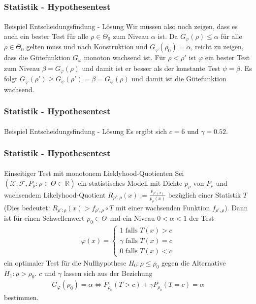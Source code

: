 \documentclass{beamer}
\begin{document}
\begin{frame}
    \frametitle{Statistik - Hypothesentest}
\framesubtitle{}

\begin{block}{Beispiel Entscheidungsfindung - Lösung}
Wir müssen also noch zeigen, dass es auch ein bester Test für alle $\rho \in \Theta_0$ zum Niveau $\alpha$ ist. 
Da  $G_{\varphi} (\rho) \leq \alpha$ für alle $\rho \in \Theta_0$  gelten muss und nach Konstruktion und $G_{\varphi} (\rho_0) = \alpha$, reicht zu zeigen, dass die Gütefunktion  $G_{\varphi}$ monoton wachsend ist. Für $\rho < \rho'$ ist $\varphi$ ein bester Test zum Niveau $\beta = G_{\varphi} (\rho)$ und damit ist er besser als der konstante Test  $\psi = \beta$. Es folgt  
$G_{\varphi} (\rho') \geq G_{\psi} (\rho') = \beta = G_{\varphi} (\rho) $ und damit ist die Gütefunktion  wachsend.
\end{block}

 \end{frame}



\begin{frame}
    \frametitle{Statistik - Hypothesentest}
\framesubtitle{}

\begin{block}{Beispiel Entscheidungsfindung - Lösung}
Es ergibt sich $c = 6$ und $\gamma = 0.52$.
\end{block}

 \end{frame}



\begin{frame}
    \frametitle{Statistik - Hypothesentest}
\framesubtitle{}

\begin{block}{Einseitiger Test mit monotonem Lieklyhood-Quotienten}
Sei   $(\mathcal{X}, \mathcal{F}, P_\rho :  \rho \in \Theta \subset \mathbb{R})$ ein statistisches Modell mit Dichte $p_{\rho}$ von $P_\rho$ und wachsendem  Likelyhood-Quotient  $R_{\rho' : \rho} (x):= \frac{p_{\rho' (x)}}{p_{\rho}(x)}$ bezüglich einer Statistik  $T$ (Dies bedeutet: $R_{\rho' : \rho} (x) > f_{\rho', \rho} \circ T$ mit einer wachsenden Funktion $f_{\rho', \rho}$). Dann ist für einen  Schwellenwert $\rho_0 \in \Theta$ und ein Niveau $0 <\alpha < 1$ der Test 
\begin{align*}
 \varphi(x) = \begin{cases} 1 \text{ falls } T(x) > c \\  \gamma  \text{ falls } T(x) = c \\ 0 \text{ falls } T(x) < c  \end{cases}
\end{align*}
ein optimaler Test für die Nullhypothese $H_0 : \rho \leq \rho_0$ gegen die Alternative  $H_1 : \rho > \rho_0$. 
$c$ und $\gamma$ lassen sich aus der Beziehung
\begin{align}
G_\varphi(\rho_0) = \alpha  \Leftrightarrow P_{\rho_0}(T  > c) + \gamma P_{\rho_0}(T = c) = \alpha
\end{align}
 bestimmen.
\end{block}



 \end{frame}
\end{document}
